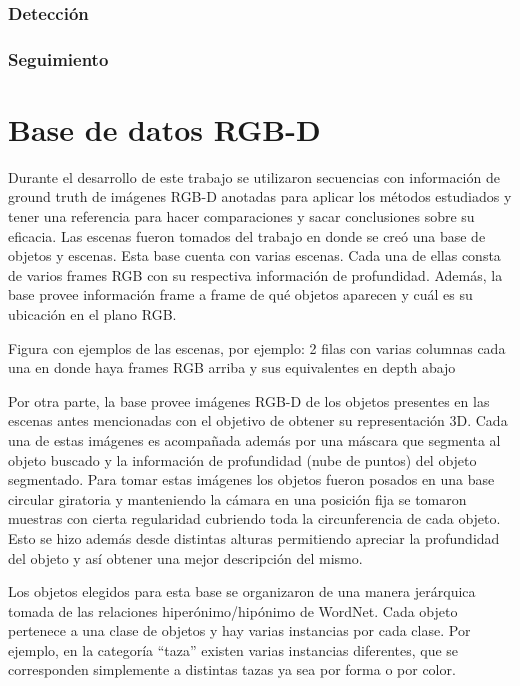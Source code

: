 \subsection{Detección}

\subsection{Seguimiento}










\chapter{Base de datos RGB-D}\label{base_rgbd}
Durante el desarrollo de este trabajo se utilizaron secuencias con información de ground truth de imágenes RGB-D anotadas para aplicar los métodos estudiados y tener una referencia para hacer comparaciones y sacar conclusiones sobre su eficacia. Las escenas fueron tomados del trabajo \cite{lai2011large} en donde se creó una base de objetos y escenas. Esta base cuenta con varias escenas. Cada una de ellas consta de varios frames RGB con su respectiva información de profundidad. Además, la base provee información frame a frame de qué objetos aparecen y cuál es su ubicación en el plano RGB.

{\huge Figura con ejemplos de las escenas, por ejemplo: 2 filas con varias columnas cada una en donde haya frames RGB arriba y sus equivalentes en depth abajo}

Por otra parte, la base provee imágenes RGB-D de los objetos presentes en las escenas antes mencionadas con el objetivo de obtener su representación 3D. Cada una de estas imágenes es acompañada además por una máscara que segmenta al objeto buscado y la información de profundidad (nube de puntos) del objeto segmentado. Para tomar estas imágenes los objetos fueron posados en una base circular giratoria y manteniendo la cámara en una posición fija se tomaron muestras con cierta regularidad cubriendo toda la circunferencia de cada objeto. Esto se hizo además desde distintas alturas permitiendo apreciar la profundidad del objeto y así obtener una mejor descripción del mismo.

Los objetos elegidos para esta base se organizaron de una manera jerárquica tomada de las relaciones hiperónimo/hipónimo de WordNet. Cada objeto pertenece a una clase de objetos y hay varias instancias por cada clase. Por ejemplo, en la categoría ``taza'' existen varias instancias diferentes, que se corresponden simplemente a distintas tazas ya sea por forma o por color.

